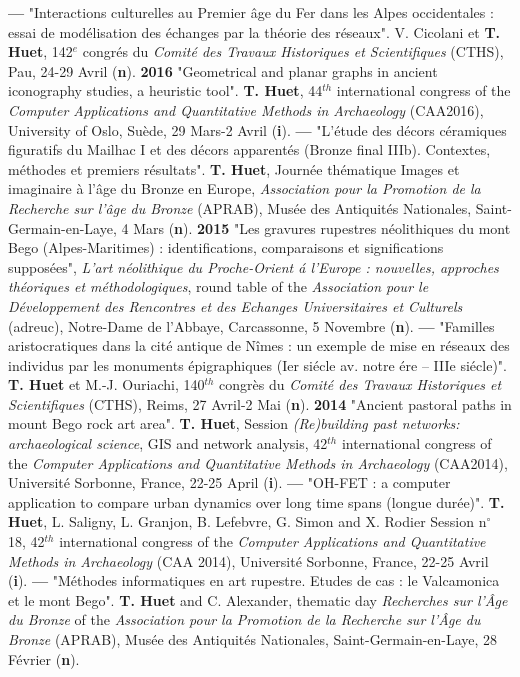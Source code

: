 \documentclass{article}
\begin{document}
\smallbreak
\textbf{--- } "Interactions culturelles au Premier \^{a}ge du Fer dans les Alpes occidentales : essai de mod\'{e}lisation des \'{e}changes par la th\'{e}orie des r\'{e}seaux". V. Cicolani et \textbf{T. Huet}, 142${}^{e}$ congr\'{e}s du \textit{Comit\'{e} des Travaux Historiques et Scientifiques} (CTHS), Pau, 24-29 Avril (\textbf{n}).
\smallbreak
\textbf{2016 }"Geometrical and planar graphs in ancient iconography studies, a heuristic tool". \textbf{T. Huet}, 44${}^{th}$ international congress of the \textit{Computer Applications and Quantitative Methods in Archaeology} (CAA2016), University of Oslo, Suède, 29 Mars-2 Avril (\textbf{i}).
\smallbreak
\textbf{--- }"L'\'{e}tude des d\'{e}cors c\'{e}ramiques figuratifs du Mailhac I et des d\'{e}cors apparent\'{e}s (Bronze final IIIb). Contextes, m\'{e}thodes et premiers r\'{e}sultats". \textbf{T. Huet}, Journ\'{e}e th\'{e}matique Images et imaginaire \`{a} l'\^{a}ge du Bronze en Europe, \textit{Association pour la Promotion de la Recherche sur l'\^{a}ge du Bronze} (APRAB), Mus\'{e}e des Antiquit\'{e}s Nationales, Saint-Germain-en-Laye, 4 Mars (\textbf{n}).
\smallbreak
\textbf{2015 }"Les gravures rupestres n\'{e}olithiques du mont Bego (Alpes-Maritimes) : identifications, comparaisons et significations suppos\'{e}es", \textit{L'art n\'{e}olithique du Proche-Orient \'{a} l'Europe : nouvelles, approches th\'{e}oriques et m\'{e}thodologiques}, round table of the \textit{Association pour le D\'{e}veloppement des Rencontres et des Echanges Universitaires et Culturels} (adreuc), Notre-Dame de l'Abbaye, Carcassonne, 5 Novembre (\textbf{n}).
\smallbreak
\textbf{--- }"Familles aristocratiques dans la cit\'{e} antique de N\^{i}mes : un exemple de mise en r\'{e}seaux des individus par les monuments \'{e}pigraphiques (Ier si\'{e}cle av. notre \'{e}re -- IIIe si\'{e}cle)". \textbf{T. Huet} et M.-J. Ouriachi, 140${}^{th}$ congrès du \textit{Comit\'{e} des Travaux Historiques et Scientifiques} (CTHS), Reims, 27 Avril-2 Mai (\textbf{n}).
\smallbreak
\textbf{2014 }"Ancient pastoral paths in mount Bego rock art area". \textbf{T. Huet}, Session \textit{(Re)building past networks: archaeological science}, GIS and network analysis, 42${}^{th}$ international congress of the \textit{Computer Applications and Quantitative Methods in Archaeology} (CAA2014), Universit\'{e} Sorbonne, France, 22-25 April (\textbf{i}).
\smallbreak
\textbf{--- }"OH-FET : a computer application to compare urban dynamics over long time spans (longue dur\'{e}e)". \textbf{T. Huet}, L. Saligny, L. Granjon, B. Lefebvre, G. Simon and X. Rodier Session n$\mathrm{{}^\circ}$ 18, 42${}^{th}$ international congress of the \textit{Computer Applications and Quantitative Methods in Archaeology} (CAA 2014), Universit\'{e} Sorbonne, France, 22-25 Avril (\textbf{i}).
\smallbreak
\textbf{--- }"M\'{e}thodes informatiques en art rupestre. Etudes de cas : le Valcamonica et le mont Bego". \textbf{T. Huet} and C. Alexander, thematic day \textit{Recherches sur l'\^{A}ge du Bronze }of the\textit{ Association pour la Promotion de la Recherche sur l'\^{A}ge du Bronze }(APRAB), Mus\'{e}e des Antiquit\'{e}s Nationales, Saint-Germain-en-Laye, 28 Février (\textbf{n}).
\end{document}
